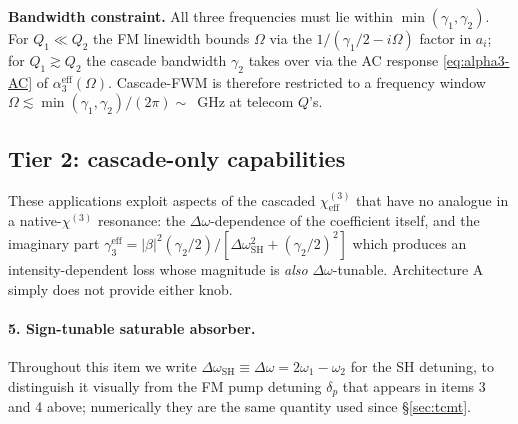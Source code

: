 \documentclass[11pt,a4paper]{article}
\newcommand{\chithree}{\chi^{(3)}}
\newcommand{\Dom}{\Delta\omega}
\begin{document}
\textbf{Bandwidth constraint.}  All three frequencies must lie within
$\min(\gamma_1,\gamma_2)$.  For $Q_1\ll Q_2$ the FM linewidth bounds
$\Omega$ via the $1/(\gamma_1/2-i\Omega)$ factor in $a_i$; for
$Q_1\gtrsim Q_2$ the cascade bandwidth $\gamma_2$ takes over via the
AC response \eqref{eq:alpha3-AC} of $\alpha_3^\text{eff}(\Omega)$.
Cascade-FWM is therefore restricted to a frequency window
$\Omega\lesssim\min(\gamma_1,\gamma_2)/(2\pi)\sim$~GHz at telecom
$Q$'s.

\subsection{Tier 2: cascade-only capabilities}

These applications exploit aspects of the cascaded $\chithree_\text{eff}$
that have no analogue in a native-$\chithree$ resonance: the
$\Dom$-dependence of the coefficient itself, and the imaginary part
$\gamma_3^\text{eff}=|\beta|^{2}(\gamma_2/2)/[\Dom_\text{SH}^{2}+(\gamma_2/2)^{2}]$
which produces an intensity-dependent loss whose magnitude is
\emph{also} $\Dom$-tunable.  Architecture A simply does not provide
either knob.

\paragraph{5. Sign-tunable saturable absorber.}
Throughout this item we write $\Dom_\text{SH}\equiv\Dom=2\omega_1-\omega_2$
for the SH detuning, to distinguish it visually from the FM pump
detuning $\delta_p$ that appears in items 3 and 4 above; numerically
they are the same quantity used since \S\ref{sec:tcmt}.
\end{document}
